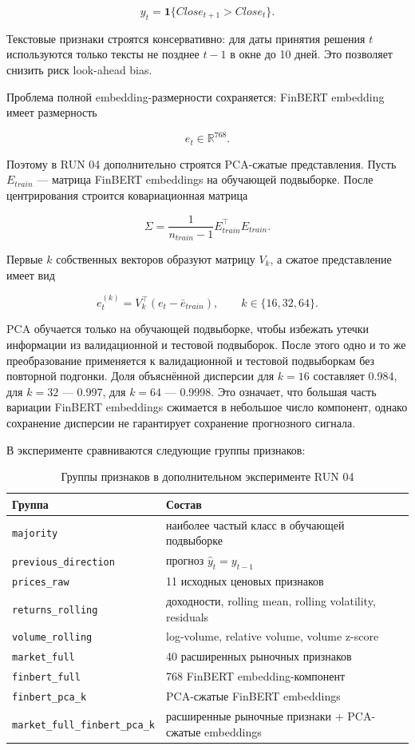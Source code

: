 \[
y_t = \mathbf{1}\{Close_{t+1} > Close_t\}.
\]

Текстовые признаки строятся консервативно: для даты принятия решения $t$ используются только тексты не позднее $t-1$ в окне до 10 дней. Это позволяет снизить риск look-ahead bias.

Проблема полной embedding-размерности сохраняется: FinBERT embedding имеет размерность

\[
e_t \in \mathbb{R}^{768}.
\]

Поэтому в RUN 04 дополнительно строятся PCA-сжатые представления. Пусть $E_{train}$ --- матрица FinBERT embeddings на обучающей подвыборке. После центрирования строится ковариационная матрица

\[
\Sigma = \frac{1}{n_{train}-1}E_{train}^{\top}E_{train}.
\]

Первые $k$ собственных векторов образуют матрицу $V_k$, а сжатое представление имеет вид

\[
e_t^{(k)} = V_k^\top(e_t-\bar e_{train}),
\qquad
k \in \{16,32,64\}.
\]

PCA обучается только на обучающей подвыборке, чтобы избежать утечки информации из валидационной и тестовой подвыборок. После этого одно и то же преобразование применяется к валидационной и тестовой подвыборкам без повторной подгонки. Доля объяснённой дисперсии для $k=16$ составляет 0.984, для $k=32$ --- 0.997, для $k=64$ --- 0.9998. Это означает, что большая часть вариации FinBERT embeddings сжимается в небольшое число компонент, однако сохранение дисперсии не гарантирует сохранение прогнозного сигнала.

В эксперименте сравниваются следующие группы признаков:

\begin{table}[htbp]
\centering
\begin{tabular}{lp{9cm}}
\toprule
Группа & Состав \\
\midrule
\texttt{majority} & наиболее частый класс в обучающей подвыборке \\
\texttt{previous\_direction} & прогноз $\hat y_t = y_{t-1}$ \\
\texttt{prices\_raw} & 11 исходных ценовых признаков \\
\texttt{returns\_rolling} & доходности, rolling mean, rolling volatility, residuals \\
\texttt{volume\_rolling} & log-volume, relative volume, volume z-score \\
\texttt{market\_full} & 40 расширенных рыночных признаков \\
\texttt{finbert\_full} & 768 FinBERT embedding-компонент \\
\texttt{finbert\_pca\_k} & PCA-сжатые FinBERT embeddings \\
\texttt{market\_full\_finbert\_pca\_k} & расширенные рыночные признаки + PCA-сжатые embeddings \\
\bottomrule
\end{tabular}
\caption{Группы признаков в дополнительном эксперименте RUN 04}
\label{tab:run04_feature_groups}
\end{table}

